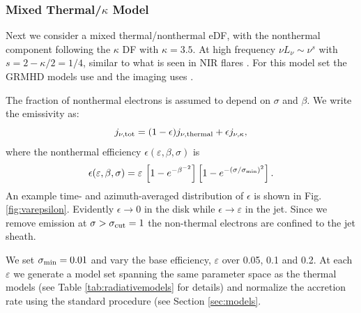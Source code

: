 \subsubsection{Mixed Thermal/\texorpdfstring{$\kappa$}{kappa} Model}

Next we consider a mixed thermal/nonthermal eDF, with the nonthermal component following the $\kappa$ DF with $\kappa = 3.5$.  At high frequency $\nu L_\nu \sim \nu^s$ with $s = 2 - \kappa/2 = 1/4$, similar to what is seen in NIR flares \citep{2007ApJ...667..900H}.  For this model set the GRMHD models use \bhac and the imaging uses \bhoss.

The fraction of nonthermal electrons is assumed to depend on $\sigma$ and $\beta$.  We write the emissivity as:
\begin{equation}
j_{\nu,\rm{tot}}=(1-\epsilon) j_{\nu,\rm{thermal}} + \epsilon j_{\nu, \kappa},
\label{eq:kappaeff}
\end{equation}
where the nonthermal efficiency $\epsilon( \varepsilon, \beta, \sigma)$ is
\begin{equation}
    \epsilon(\varepsilon,\beta,\sigma)=\varepsilon\,
    \left[1 - e^{-\beta^{-2}}\right]
    \left[1-e^{-(\sigma/\sigma_{\rm min})^2}\right].
    \label{eq:efficiencybetasigma}
\end{equation}
An example time- and azimuth-averaged distribution of $\epsilon$ is shown in Fig. \ref{fig:varepsilon}.  Evidently $\epsilon \rightarrow 0$ in the disk while $\epsilon \rightarrow \varepsilon$ in the jet.  Since we remove emission at $\sigma > \sigma_{\rm cut} = 1$ the non-thermal electrons are confined to the jet sheath.

We set $\sigma_{\rm min}=0.01$ and vary the base efficiency, $\varepsilon$ over 0.05, 0.1 and 0.2.  At each $\varepsilon$ we generate a model set spanning the same parameter space as the thermal models (see Table \ref{tab:radiativemodels} for details) and normalize the accretion rate using the standard procedure (see Section \ref{sec:models}.


